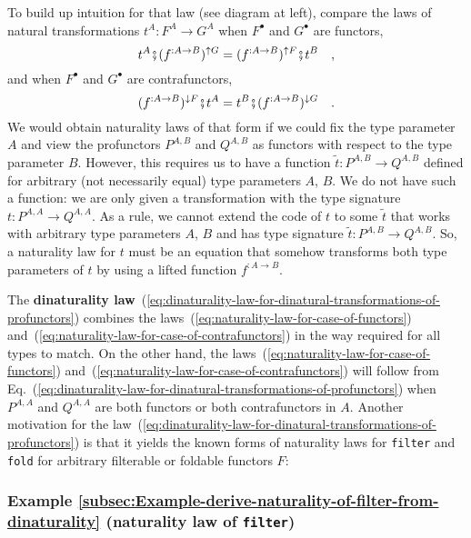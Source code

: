 To build up intuition for that law (see diagram at left), compare
the laws of natural transformations $t^{A}:F^{A}\rightarrow G^{A}$
when $F^{\bullet}$ and $G^{\bullet}$ are functors,
\begin{equation}
t^{A}\bef(f^{:A\rightarrow B})^{\uparrow G}=(f^{:A\rightarrow B})^{\uparrow F}\bef t^{B}\quad,\label{eq:naturality-law-for-case-of-functors}
\end{equation}
and when $F^{\bullet}$ and $G^{\bullet}$ are contrafunctors,
\begin{equation}
(f^{:A\rightarrow B})^{\downarrow F}\bef t^{A}=t^{B}\bef(f^{:A\rightarrow B})^{\downarrow G}\quad.\label{eq:naturality-law-for-case-of-contrafunctors}
\end{equation}
We would obtain naturality laws of that form if we could fix the type
parameter $A$ and view the profunctors $P^{A,B}$ and $Q^{A,B}$
as functors with respect to the type parameter $B$. However, this
requires us to have a function $\tilde{t}:P^{A,B}\rightarrow Q^{A,B}$
defined for arbitrary (not necessarily equal) type parameters $A$,
$B$. We do not have such a function: we are only given a transformation
with the type signature $t:P^{A,A}\rightarrow Q^{A,A}$. As a rule,
we cannot extend the code of $t$ to some $\tilde{t}$ that works
with arbitrary type parameters $A$, $B$ and has type signature $\tilde{t}:P^{A,B}\rightarrow Q^{A,B}$.
So, a naturality law for $t$ must be an equation that somehow transforms
both type parameters of $t$ by using a lifted function $f^{:A\rightarrow B}$. 

The \textbf{dinaturality
law}~(\ref{eq:dinaturality-law-for-dinatural-transformations-of-profunctors})
combines the laws~(\ref{eq:naturality-law-for-case-of-functors})
and~(\ref{eq:naturality-law-for-case-of-contrafunctors}) in the
way required for all types to match. On the other hand, the laws~(\ref{eq:naturality-law-for-case-of-functors})
and~(\ref{eq:naturality-law-for-case-of-contrafunctors}) will follow
from Eq.~(\ref{eq:dinaturality-law-for-dinatural-transformations-of-profunctors})
when $P^{A,A}$ and $Q^{A,A}$ are both functors or both contrafunctors
in $A$. Another motivation for the law~(\ref{eq:dinaturality-law-for-dinatural-transformations-of-profunctors})
is that it yields the known forms of naturality laws for \lstinline!filter!
and \lstinline!fold! for arbitrary filterable or foldable functors
$F$:

\subsubsection{Example \label{subsec:Example-derive-naturality-of-filter-from-dinaturality}\ref{subsec:Example-derive-naturality-of-filter-from-dinaturality}
(naturality law of \lstinline!filter!)}

